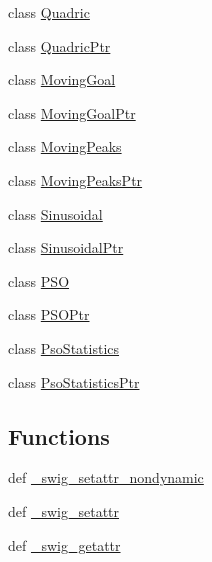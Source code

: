 \begin{CompactItemize}
\item 
class \hyperlink{classpso_1_1Quadric}{Quadric}
\item 
class \hyperlink{classpso_1_1QuadricPtr}{QuadricPtr}
\item 
class \hyperlink{classpso_1_1MovingGoal}{MovingGoal}
\item 
class \hyperlink{classpso_1_1MovingGoalPtr}{MovingGoalPtr}
\item 
class \hyperlink{classpso_1_1MovingPeaks}{MovingPeaks}
\item 
class \hyperlink{classpso_1_1MovingPeaksPtr}{MovingPeaksPtr}
\item 
class \hyperlink{classpso_1_1Sinusoidal}{Sinusoidal}
\item 
class \hyperlink{classpso_1_1SinusoidalPtr}{SinusoidalPtr}
\item 
class \hyperlink{classpso_1_1PSO}{PSO}
\item 
class \hyperlink{classpso_1_1PSOPtr}{PSOPtr}
\item 
class \hyperlink{classpso_1_1PsoStatistics}{PsoStatistics}
\item 
class \hyperlink{classpso_1_1PsoStatisticsPtr}{PsoStatisticsPtr}
\end{CompactItemize}
\subsection*{Functions}
\begin{CompactItemize}
\item 
def \hyperlink{namespacepso_7657775da111513d2fbef74487722796}{\_\-swig\_\-setattr\_\-nondynamic}
\item 
def \hyperlink{namespacepso_91ad28c204da85fd55f702adc65326dc}{\_\-swig\_\-setattr}
\item 
def \hyperlink{namespacepso_dc78041cebaa55ad5cca2496dc9f1404}{\_\-swig\_\-getattr}
\end{CompactItemize}
